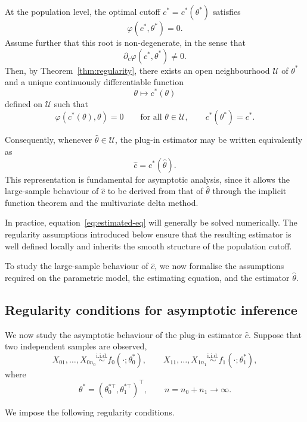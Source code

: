 \documentclass[11pt,a4paper]{article}
\theoremstyle{definition}
\theoremstyle{remark}
\newcommand{\1}{\mathbf{1}}
\begin{document}
\noindent
At the population level, the optimal cutoff
$c^*=c^*(\theta^*)$ satisfies
\[
\varphi(c^*,\theta^*)=0.
\]
Assume further that this root is non-degenerate, in the sense
that
\[
\partial_c\varphi(c^*,\theta^*)\neq 0.
\]
Then, by Theorem~\ref{thm:regularity}, there exists an open
neighbourhood $\mathcal U$ of $\theta^*$ and a unique
continuously differentiable function
\[
\theta\mapsto c^*(\theta)
\]
defined on $\mathcal U$ such that
\[
\varphi(c^*(\theta),\theta)=0
\qquad\text{for all }\theta\in\mathcal U,
\qquad
c^*(\theta^*)=c^*.
\]

\noindent
Consequently, whenever $\hat\theta\in\mathcal U$, the plug-in
estimator may be written equivalently as
\[
\hat c=c^*(\hat\theta).
\]
This representation is fundamental for asymptotic analysis,
since it allows the large-sample behaviour of $\hat c$ to be
derived from that of $\hat\theta$ through the implicit function
theorem and the multivariate delta method.

In practice, equation~\eqref{eq:estimated-eq} will generally be
solved numerically. The regularity assumptions introduced below
ensure that the resulting estimator is well defined locally and
inherits the smooth structure of the population cutoff.

To study the large-sample behaviour of $\hat c$, we now
formalise the assumptions required on the parametric model, the
estimating equation, and the estimator $\hat\theta$.

\subsection{Regularity conditions for asymptotic inference}

We now study the asymptotic behaviour of the plug-in estimator
$\hat c$. Suppose that two independent samples are observed,
\[
X_{01},\ldots,X_{0n_0}\stackrel{\mathrm{i.i.d.}}{\sim}
f_0(\cdot;\theta_0^*),
\qquad
X_{11},\ldots,X_{1n_1}\stackrel{\mathrm{i.i.d.}}{\sim}
f_1(\cdot;\theta_1^*),
\]
where
\[
\theta^*=(\theta_0^{*\top},\theta_1^{*\top})^\top,
\qquad
n=n_0+n_1\to\infty.
\]

\noindent
We impose the following regularity conditions.
\end{document}
